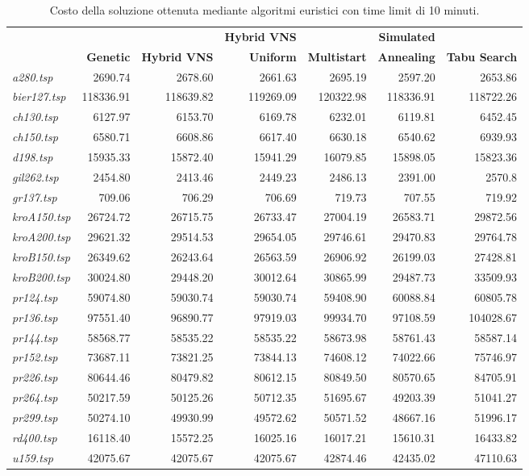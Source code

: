 {\footnotesize
\begin{longtable}[H]{lrrrrrr}
\caption{Costo della soluzione ottenuta mediante algoritmi euristici con time limit di 10 minuti.}\\
\hline
{} & {} & {} & \textbf{Hybrid VNS} & {} & \textbf{Simulated} & {}\\
{} & \textbf{Genetic} & \textbf{Hybrid VNS} & \textbf{Uniform} & \textbf{Multistart} & \textbf{Annealing} & \textbf{Tabu Search}\\
\hline
\textit{a280.tsp} & 2690.74 & 2678.60 & 2661.63 & 2695.19 & 2597.20 & 2653.86\\
\textit{bier127.tsp} & 118336.91 & 118639.82 & 119269.09 & 120322.98 & 118336.91 & 118722.26\\
\textit{ch130.tsp} & 6127.97 & 6153.70 & 6169.78 & 6232.01 & 6119.81 & 6452.45\\
\textit{ch150.tsp} & 6580.71 & 6608.86 & 6617.40 & 6630.18 & 6540.62 & 6939.93\\
\textit{d198.tsp} & 15935.33 & 15872.40 & 15941.29 & 16079.85 & 15898.05 & 15823.36\\
\textit{gil262.tsp} & 2454.80 & 2413.46 & 2449.23 & 2486.13 & 2391.00 & 2570.8\\
\textit{gr137.tsp} & 709.06 & 706.29 & 706.69 & 719.73 & 707.55 & 719.92\\
\textit{kroA150.tsp} & 26724.72 & 26715.75 & 26733.47 & 27004.19 & 26583.71 & 29872.56\\
\textit{kroA200.tsp} & 29621.32 & 29514.53 & 29654.05 & 29746.61 & 29470.83 & 29764.78\\
\textit{kroB150.tsp} & 26349.62 & 26243.64 & 26563.59 & 26906.92 & 26199.03 & 27428.81\\
\textit{kroB200.tsp} & 30024.80 & 29448.20 & 30012.64 & 30865.99 & 29487.73 & 33509.93\\
\textit{pr124.tsp} & 59074.80 & 59030.74 & 59030.74 & 59408.90 & 60088.84 & 60805.78\\
\textit{pr136.tsp} & 97551.40 & 96890.77 & 97919.03 & 99934.70 & 97108.59 & 104028.67\\
\textit{pr144.tsp} & 58568.77 & 58535.22 & 58535.22 & 58673.98 & 58761.43 & 58587.14\\
\textit{pr152.tsp} & 73687.11 & 73821.25 & 73844.13 & 74608.12 & 74022.66 & 75746.97\\
\textit{pr226.tsp} & 80644.46 & 80479.82 & 80612.15 & 80849.50 & 80570.65 & 84705.91\\
\textit{pr264.tsp} & 50217.59 & 50125.26 & 50712.35 & 51695.67 & 49203.39 & 51041.27\\
\textit{pr299.tsp} & 50274.10 & 49930.99 & 49572.62 & 50571.52 & 48667.16 & 51996.17\\
\textit{rd400.tsp} & 16118.40 & 15572.25 & 16025.16 & 16017.21 & 15610.31 & 16433.82\\
\textit{u159.tsp} & 42075.67 & 42075.67 & 42075.67 & 42874.46 & 42435.02 & 47110.63\\
\hline
\end{longtable}
}
